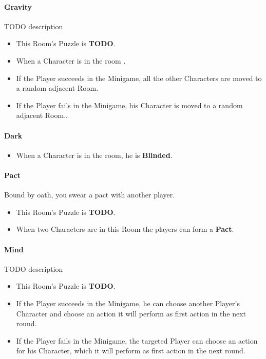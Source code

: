 \paragraph{Gravity} TODO description
\begin{itemize}
	\item This Room's Puzzle is \textbf{TODO}.
	\item When a Character is in the room .
	\item If the Player succeeds in the Minigame, all the other Characters are moved to a random adjacent Room.
	\item If the Player fails    in the Minigame, his Character is moved to a random adjacent Room..
\end{itemize}

\paragraph{Dark} 
\begin{itemize}
	\item When a Character is in the room, he is \textbf{Blinded}.
\end{itemize}

\paragraph{Pact} Bound by oath, you swear a pact with another player. 
\begin{itemize}
	\item This Room's Puzzle is \textbf{TODO}.
	\item When two Characters are in this Room the players can form a \textbf{Pact}.
\end{itemize}

\paragraph{Mind} TODO description
\begin{itemize}
	\item This Room's Puzzle is \textbf{TODO}.
	\item If the Player succeeds in the Minigame, he can choose another Player's Character and choose an action it will perform as first action in the next round.
	\item If the Player fails    in the Minigame, the targeted Player can choose an action for his Character, which it will perform as first action in the next round.
\end{itemize}

